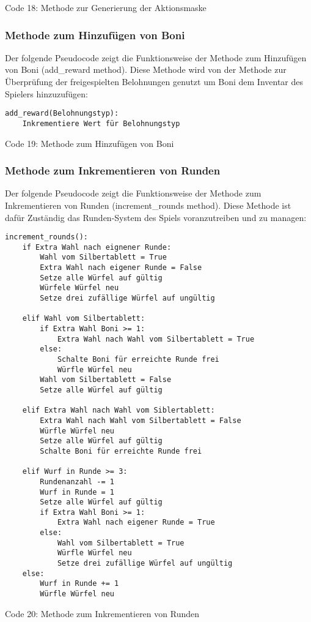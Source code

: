 Code 18: Methode zur Generierung der Aktionsmaske\\

\subsubsection{Methode zum Hinzufügen von Boni}
\begin{minipage}{\linewidth}
Der folgende Pseudocode zeigt die Funktionsweise der Methode zum Hinzufügen von Boni (add\_reward method). Diese Methode wird von der Methode zur Überprüfung der freigespielten Belohnungen genutzt um Boni dem Inventar des Spielers hinzuzufügen:
\vspace{0.5cm}
\begin{lstlisting}
add_reward(Belohnungstyp):
	Inkrementiere Wert für Belohnungstyp
\end{lstlisting}
Code 19: Methode zum Hinzufügen von Boni\\
\end{minipage}

\subsubsection{Methode zum Inkrementieren von Runden}
Der folgende Pseudocode zeigt die Funktionsweise der Methode zum Inkrementieren von Runden (increment\_rounds method). Diese Methode ist dafür Zuständig das Runden-System des Spiels voranzutreiben und zu managen:
\vspace{0.5cm}
\begin{lstlisting}
increment_rounds():
	if Extra Wahl nach eignener Runde:
		Wahl vom Silbertablett = True
		Extra Wahl nach eigener Runde = False
		Setze alle Würfel auf gültig
		Würfele Würfel neu
		Setze drei zufällige Würfel auf ungültig
		
	elif Wahl vom Silbertablett:
		if Extra Wahl Boni >= 1:
			Extra Wahl nach Wahl vom Silbertablett = True
		else:
			Schalte Boni für erreichte Runde frei
			Würfle Würfel neu
		Wahl vom Silbertablett = False
		Setze alle Würfel auf gültig
	
	elif Extra Wahl nach Wahl vom Siblertablett:
		Extra Wahl nach Wahl vom Silbertablett = False
		Würfle Würfel neu
		Setze alle Würfel auf gültig
		Schalte Boni für erreichte Runde frei
	
	elif Wurf in Runde >= 3:
		Rundenanzahl -= 1
		Wurf in Runde = 1
		Setze alle Würfel auf gültig
		if Extra Wahl Boni >= 1:
			Extra Wahl nach eigener Runde = True
		else:
			Wahl vom Silbertablett = True
			Würfle Würfel neu
			Setze drei zufällige Würfel auf ungültig
	else:
		Wurf in Runde += 1
		Würfle Würfel neu
\end{lstlisting}
Code 20: Methode zum Inkrementieren von Runden\\

